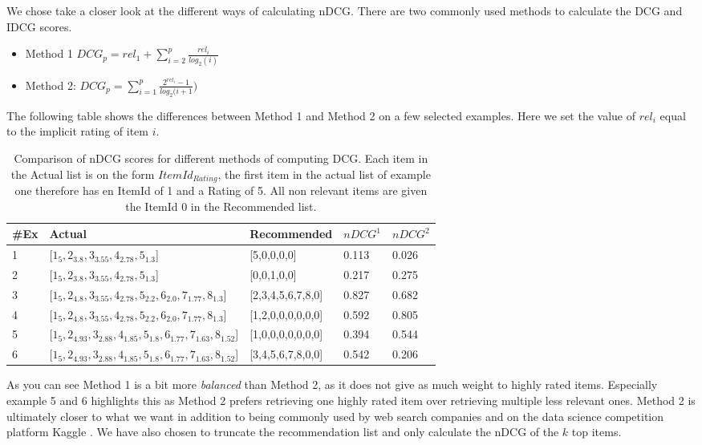 We chose take a closer look at the different ways of calculating nDCG. There are two commonly used methods to calculate the DCG and IDCG scores.

\begin{itemize}
\item Method 1  $DCG_p = rel_1 + \sum_{i=2}^{p} \frac{rel_i}{log_2(i)}$
\item Method 2: $DCG_p = \sum_{i=1}^{p} \frac{2^{rel_i}-1}{log_2(i+1})$
\end{itemize}

The following table shows the differences between Method 1 and Method 2 on a few selected examples. Here we set the value of $rel_i$ equal to the implicit rating of item $i$.

\begin{table}[H]
\label{table:ndcgfinal}
\centering
\begin{tabular}{*{5}l}
\toprule
\#Ex & 	Actual																	& 	Recommended				&	$nDCG^1$  	   & $nDCG^2$	\\ \midrule
1 		& 	[$1_{5}, 2_{3.8}, 3_{3.55}, 4_{2.78},5_{1.3}$]								&	[5,0,0,0,0]				&	0.113 		   & 0.026  \\ 
2 		& 	[$1_{5}, 2_{3.8}, 3_{3.55}, 4_{2.78},5_{1.3}$]								&	[0,0,1,0,0]				&	0.217 		   & 0.275   \\ 
3   	& 	[$1_{5},2_{4.8}, 3_{3.55}, 4_{2.78}, 5_{2.2}, 6_{2.0},7_{1.77},8_{1.3}$]		&	[2,3,4,5,6,7,8,0]		&	0.827		   & 0.682   \\ 
4  		& 	[$1_{5},2_{4.8}, 3_{3.55}, 4_{2.78}, 5_{2.2}, 6_{2.0},7_{1.77},8_{1.3}$]		&	[1,2,0,0,0,0,0,0]		&	0.592 		   & 0.805   \\
5 		& 	[$1_{5},2_{4.93},3_{2.88}, 4_{1.85},5_{1.8},6_{1.77}, 7_{1.63},8_{1.52}$]	&	[1,0,0,0,0,0,0,0]		&	0.394 		   & 0.544   \\
6 		& 	[$1_{5},2_{4.93},3_{2.88}, 4_{1.85},5_{1.8},6_{1.77}, 7_{1.63},8_{1.52}$]	&	[3,4,5,6,7,8,0,0]		&	0.542 		   & 0.206   \\
\bottomrule
\end{tabular}
\caption{Comparison of nDCG scores for different methods of computing DCG. Each item in the Actual list is on the form $ItemId_{Rating}$, the first item in the actual list of example one therefore has en ItemId of 1 and a Rating of 5. All non relevant items are given the ItemId 0 in the Recommended list.}
\end{table}

As you can see Method 1 is a bit more \emph{balanced} than Method 2, as it does not give as much weight to highly rated items. Especially example 5 and 6 highlights this as Method 2 prefers retrieving one highly rated item over retrieving multiple less relevant ones. Method 2 is ultimately closer to what we want in addition to being commonly used by web search companies and on the data science competition platform Kaggle \cite{kaggle}. We have also chosen to truncate the recommendation list and only calculate the nDCG of the $k$ top items.


